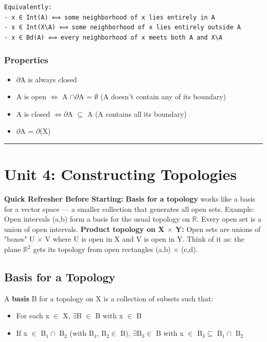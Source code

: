 \documentclass[12pt,a4paper,openany]{book}
\begin{document}
{{\begin{verbatim}
Equivalently:
- x ∈ Int(A) ⟺ some neighborhood of x lies entirely in A
- x ∈ Int(X\A) ⟺ some neighborhood of x lies entirely outside A  
- x ∈ Bd(A) ⟺ every neighborhood of x meets both A and X\A
\end{verbatim}

\subsubsection{Properties}
\begin{itemize}
  \item $\partial$A is always closed
  \item A is open $\Longleftrightarrow$ A $\cap\partial$A = $\emptyset$ (A doesn't contain any of its boundary)
  \item A is closed $\Longleftrightarrow\partial$A $\subseteq$ A (A contains all its boundary)
  \item $\partial$A = $\partial$(X\A)
\end{itemize}

\bigskip\noindent\rule{\textwidth}{0.4pt}\bigskip

\section{Unit 4: Constructing Topologies}

\begin{prereqbox}
 \textbf{Quick Refresher Before Starting:}
\textbf{Basis for a topology} works like a basis for a vector space — a smaller collection that generates all open sets.
Example: Open intervals (a,b) form a basis for the usual topology on $\mathbb{R}$. Every open set is a union of open intervals.
\textbf{Product topology on X $\times$ Y:} Open sets are unions of "boxes" U $\times$ V where U is open in X and V is open in Y.
Think of it as: the plane $\mathbb{R}^2$ gets its topology from open rectangles (a,b) $\times$ (c,d).
\end{prereqbox}


\subsection{Basis for a Topology }

A \textbf{basis} B for a topology on X is a collection of subsets such that:
\begin{itemize}
  \item For each x $\in$ X, $\exists$B $\in$ B with x $\in$ B
  \item If x $\in$ B$_1\cap$ B$_2$ (with B$_1$, B$_2\in$ B), $\exists$B$_3\in$ B with x $\in$ B$_3\subseteq$ B$_1\cap$ B$_2$
\end{itemize}

}}
\end{document}
